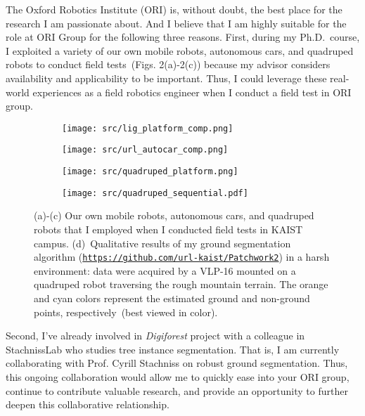 \documentclass[11pt, a4paper]{../awesome-cv}
\begin{document}
\begin{cvletter}

The Oxford Robotics Institute (ORI) is, without doubt, the best place for the research I am passionate about.
And I believe that I am highly suitable for the role at ORI Group for the following three reasons.
First, during my Ph.D.~course, I exploited a variety of our own mobile robots, autonomous cars, and quadruped robots to conduct field tests~(Figs. 2(a)-2(c)) because my advisor considers availability and applicability to be important.
Thus, I could leverage these real-world experiences as a field robotics engineer when I conduct a field test in ORI group.

\newcommand{\platformwidth}{0.15\textwidth}
\begin{figure}[b!]
	\centering
	\begin{subfigure}[b]{\platformwidth}
		\texttt{[image: src/lig\_platform\_comp.png]}
        \caption{}
	\end{subfigure}
    \begin{subfigure}[b]{\platformwidth}
		\texttt{[image: src/url\_autocar\_comp.png]}
        \caption{}
	\end{subfigure}
    \begin{subfigure}[b]{\platformwidth}
		\texttt{[image: src/quadruped\_platform.png]}
        \caption{}
	\end{subfigure}
    \begin{subfigure}[b]{0.5\textwidth}
		\texttt{[image: src/quadruped\_sequential.pdf]}
        \caption{}
	\end{subfigure}
	\captionsetup{font=footnotesize}
	\caption{(a)-(c) Our own mobile robots, autonomous cars, and quadruped robots that I employed when I conducted field tests in KAIST campus. (d)~Qualitative results of my ground segmentation algorithm (\href{https://github.com/url-kaist/Patchwork2}{\texttt{https://github.com/url-kaist/Patchwork2}}) in a harsh environment: data were acquired by a VLP-16 mounted on a quadruped robot traversing the rough mountain terrain. The orange and cyan colors represent the estimated ground and non-ground points, respectively~(best viewed in color).}
	\label{figure:why_ori}
\end{figure}

Second, I've already involved in \textit{Digiforest} project with a colleague in StachnissLab who studies tree instance segmentation.
That is, I am currently collaborating with Prof. Cyrill Stachniss on robust ground segmentation.
Thus, this ongoing collaboration would allow me to quickly ease into your ORI group, continue to contribute valuable research, and provide an opportunity to further deepen this collaborative relationship.


\end{cvletter}
\end{document}
